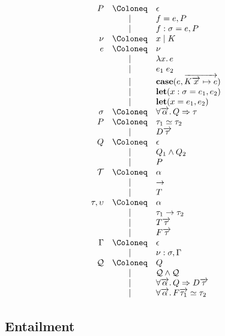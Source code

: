 \begin{align*}
  \begin{array}{rcl}
    P
    &\Coloneq &\epsilon \\
    &\mid &f = e, P \\
    &\mid &f: \sigma = e, P \\
    \nu &\Coloneq &x \mid K \\
    e
    &\Coloneq &\nu \\
    &\mid &\lambda x\ldotp e \\
    &\mid &e_1\; e_2 \\
    &\mid &\mathbf{case}(e, \overrightarrow{K\overrightarrow{x} \mapsto e}) \\
    &\mid &\mathbf{let}(x: \sigma = e_1, e_2) \\
    &\mid &\mathbf{let}(x = e_1, e_2) \\
    \sigma
    &\Coloneq &\forall \overrightarrow{\alpha}\ldotp Q \Rightarrow \tau \\
    P
    &\Coloneq &\tau_1 \simeq \tau_2 \\
    &\mid &D \overrightarrow{\tau} \\
    Q
    &\Coloneq &\epsilon \\
    &\mid &Q_1 \land Q_2 \\
    &\mid &P \\
    \mathcal{T}
    &\Coloneq &\alpha \\
    &\mid &\to \\
    &\mid &T \\
    \tau, \upsilon
    &\Coloneq &\alpha \\
    &\mid &\tau_1 \to \tau_2 \\
    &\mid &T \overrightarrow{\tau} \\
    &\mid &F \overrightarrow{\tau} \\
    \Gamma
    &\Coloneq &\epsilon \\
    &\mid &\nu: \sigma, \Gamma \\
    \mathcal{Q}
    &\Coloneq &Q \\
    &\mid &\mathcal{Q} \land \mathcal{Q} \\
    &\mid &\forall \overrightarrow{\alpha}\ldotp Q \Rightarrow D \overrightarrow{\tau} \\
    &\mid &\forall \overrightarrow{\alpha}\ldotp F \overrightarrow{\tau_1} \simeq \tau_2
  \end{array}
\end{align*}

\subsection{Entailment}

